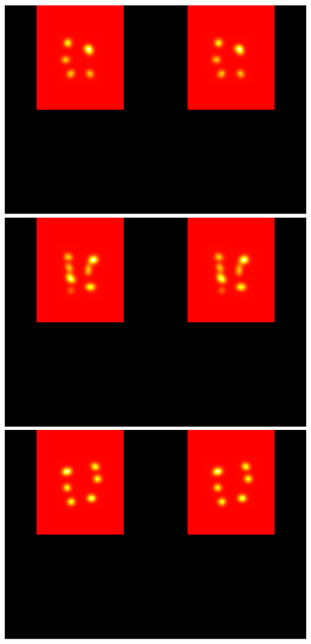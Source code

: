 \documentclass[]{article}
\begin{document}
\includegraphics{tapas-vignette_files/figure-latex/unnamed-chunk-11-7.pdf}
\includegraphics{tapas-vignette_files/figure-latex/unnamed-chunk-11-8.pdf}
\includegraphics{tapas-vignette_files/figure-latex/unnamed-chunk-11-9.pdf}
\end{document}
